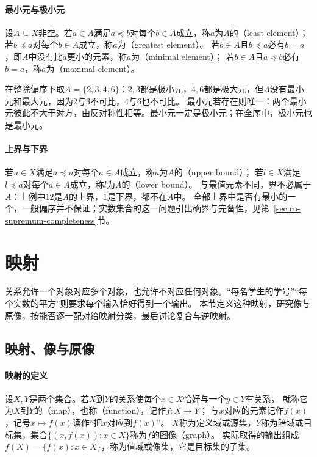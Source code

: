 \paragraph{最小元与极小元}
设$A\subseteq X$非空。若$a\in A$满足$a\preceq b$对每个$b\in A$成立，称$a$为$A$的（least element）；
若$b\preceq a$对每个$b\in A$成立，称$a$为（greatest element）。
若$b\in A$且$b\preceq a$必有$b=a$，即$A$中没有比$a$更小的元素，称$a$为（minimal element）；
若$b\in A$且$a\preceq b$必有$b=a$，称$a$为（maximal element）。

在整除偏序下取$A=\{2,3,4,6\}$：$2,3$都是极小元，$4,6$都是极大元，但$A$没有最小元和最大元，因为$2$与$3$不可比，$4$与$6$也不可比。
最小元若存在则唯一：两个最小元彼此不大于对方，由反对称性相等。最小元一定是极小元；在全序中，极小元也是最小元。

\paragraph{上界与下界}
若$u\in X$满足$a\preceq u$对每个$a\in A$成立，称$u$为$A$的（upper bound）；
若$l\in X$满足$l\preceq a$对每个$a\in A$成立，称$l$为$A$的（lower bound）。
与最值元素不同，界不必属于$A$：上例中$12$是$A$的上界，$1$是下界，都不在$A$中。
全部上界中是否有最小的一个，一般偏序并不保证；实数集合的这一问题引出确界与完备性，见第~\ref{sec:ru-supremum-completeness}节。

\section{映射}
\label{sec:prelim-functions-value-ranges}

关系允许一个对象对应多个对象，也允许不对应任何对象。“每名学生的学号”“每个实数的平方”则要求每个输入恰好得到一个输出。
本节定义这种映射，研究像与原像，按能否逐一配对给映射分类，最后讨论复合与逆映射。

\subsection{映射、像与原像}
\label{sec:prelim-function-definition}

\paragraph{映射的定义}
设$X,Y$是两个集合。若$X$到$Y$的关系使每个$x\in X$恰好与一个$y\in Y$有关系，
就称它为$X$到$Y$的（map），也称（function），记作$f:X\to Y$；
与$x$对应的元素记作$f(x)$，记号$x\mapsto f(x)$读作“把$x$对应到$f(x)$”。
$X$称为定义域或源集，$Y$称为陪域或目标集，集合$\{(x,f(x)):x\in X\}$称为$f$的图像（graph）。
实际取得的输出组成$f(X)=\{f(x):x\in X\}$，称为值域或像集，它是目标集的子集。

